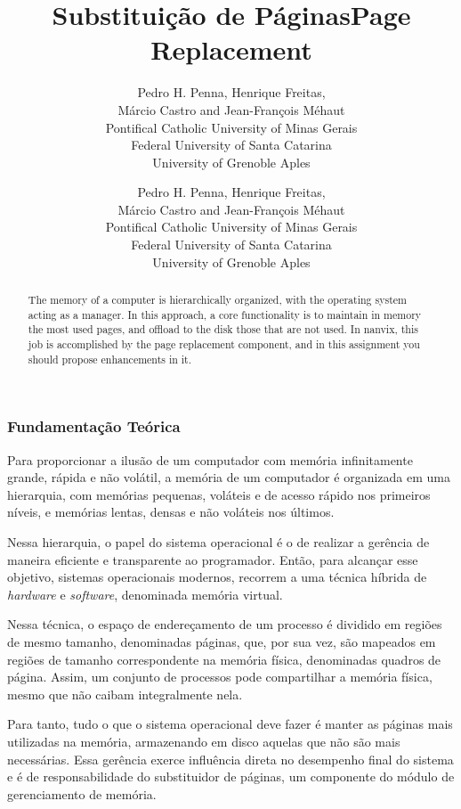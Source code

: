 \documentclass[11pt]{article}
\title{Substituição de Páginas}
\author{
	Pedro H. Penna, Henrique Freitas,\\%
	Márcio Castro and Jean-François Méhaut\\[0.3em]
	\small Pontifical Catholic University of Minas Gerais\\
	\small Federal University of Santa Catarina\\
	\small University of Grenoble Aples}
\date{}
\title{Page Replacement}
\author{
	Pedro H. Penna, Henrique Freitas,\\%
	Márcio Castro and Jean-François Méhaut\\[0.3em]
	\small Pontifical Catholic University of Minas Gerais\\
	\small Federal University of Santa Catarina\\
	\small University of Grenoble Aples}
\date{}
\newif\ifbr
\newif\ifen
\begin{document}
\maketitle

\begin{abstract}
\ifbr
	\noindent A memória de um computador é organizada em uma hierarquia,
	com o sistema operacional atuando como gerente. Nessa organização,
	uma função fundamental é a de manter páginas utilizadas em memória e
	descarregar as não necessárias em disco. No Nanvix, essa tarefa é de
	responsabilidade do substituidor de páginas e nesse projeto você
	deverá propor melhorias a ele.
\else\ifen
	\noindent The memory of a computer is hierarchically organized, with
	the operating system acting as a manager. In this approach, a core
	functionality is to maintain in memory the most used pages, and
	offload to the disk those that are not used. In nanvix, this job is
	accomplished by the page replacement component, and in this
	assignment you should propose enhancements in it.
\fi\fi
\end{abstract}

\ifbr
	\subsubsection*{Fundamentação Teórica}

		Para proporcionar a ilusão de um computador com memória
		infinitamente grande, rápida e não volátil, a memória de um
		computador é organizada em uma hierarquia, com memórias
		pequenas, voláteis e de acesso rápido nos primeiros níveis, e
		memórias lentas, densas e não voláteis nos últimos.

		Nessa hierarquia, o papel do sistema operacional é o de realizar
		a gerência de maneira eficiente e transparente ao programador.
		Então, para alcançar esse objetivo, sistemas operacionais
		modernos, recorrem a uma técnica híbrida de \textit{hardware} e
		\textit{software}, denominada memória virtual.

		Nessa técnica, o espaço de endereçamento de um processo é
		dividido em regiões de mesmo tamanho, denominadas páginas, que,
		por sua vez, são mapeados em regiões de tamanho correspondente
		na memória física, denominadas quadros de página. Assim, um
		conjunto de processos pode compartilhar a memória física, mesmo
		que não caibam integralmente nela.

		Para tanto, tudo o que o sistema operacional deve fazer é manter
		as páginas mais utilizadas na memória, armazenando em disco
		aquelas que não são mais necessárias. Essa gerência exerce
		influência direta no desempenho final do sistema e é de
		responsabilidade do substituidor de páginas, um componente do
		módulo de gerenciamento de memória.
\elseifen
\end{document}
